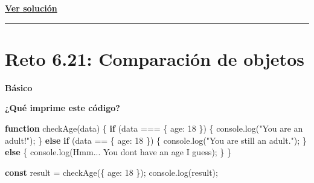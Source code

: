 \documentclass[
  letterpaper,
  DIV=11,
  numbers=noendperiod]{scrreprt}
\newenvironment{Shaded}{\begin{snugshade}}{\end{snugshade}}
\newcommand{\BuiltInTok}[1]{\textcolor[rgb]{0.00,0.23,0.31}{#1}}
\newcommand{\ControlFlowTok}[1]{\textcolor[rgb]{0.00,0.23,0.31}{\textbf{#1}}}
\newcommand{\DataTypeTok}[1]{\textcolor[rgb]{0.68,0.00,0.00}{#1}}
\newcommand{\DecValTok}[1]{\textcolor[rgb]{0.68,0.00,0.00}{#1}}
\newcommand{\FunctionTok}[1]{\textcolor[rgb]{0.28,0.35,0.67}{#1}}
\newcommand{\KeywordTok}[1]{\textcolor[rgb]{0.00,0.23,0.31}{\textbf{#1}}}
\newcommand{\NormalTok}[1]{\textcolor[rgb]{0.00,0.23,0.31}{#1}}
\newcommand{\OperatorTok}[1]{\textcolor[rgb]{0.37,0.37,0.37}{#1}}
\newcommand{\StringTok}[1]{\textcolor[rgb]{0.13,0.47,0.30}{#1}}
\newcommand{\VerbatimStringTok}[1]{\textcolor[rgb]{0.13,0.47,0.30}{#1}}
\begin{document}
\textbf{\hyperref[sec-sol-cap6-reto20]{Ver solución}}

\begin{center}\rule{0.5\linewidth}{0.5pt}\end{center}

\section{Reto 6.21: Comparación de objetos}\label{sec-cap6-reto21}

\begin{tcolorbox}[enhanced jigsaw, left=2mm, toprule=.15mm, leftrule=.75mm, breakable, colback=white, coltitle=black, bottomtitle=1mm, arc=.35mm, rightrule=.15mm, colframe=quarto-callout-caution-color-frame, opacitybacktitle=0.6, toptitle=1mm, opacityback=0, titlerule=0mm, title=\textcolor{quarto-callout-caution-color}{\faFire}\hspace{0.5em}{Dificultad}, bottomrule=.15mm, colbacktitle=quarto-callout-caution-color!10!white]

\textbf{Básico}

\end{tcolorbox}

\textbf{¿Qué imprime este código?}

\begin{Shaded}
\begin{Highlighting}[]
\KeywordTok{function} \FunctionTok{checkAge}\NormalTok{(data) \{}
  \ControlFlowTok{if}\NormalTok{ (data }\OperatorTok{===}\NormalTok{ \{ }\DataTypeTok{age}\OperatorTok{:} \DecValTok{18}\NormalTok{ \}) \{}
    \BuiltInTok{console}\OperatorTok{.}\FunctionTok{log}\NormalTok{(}\StringTok{"You are an adult!"}\NormalTok{)}\OperatorTok{;}
\NormalTok{  \} }\ControlFlowTok{else} \ControlFlowTok{if}\NormalTok{ (data }\OperatorTok{==}\NormalTok{ \{ }\DataTypeTok{age}\OperatorTok{:} \DecValTok{18}\NormalTok{ \}) \{}
    \BuiltInTok{console}\OperatorTok{.}\FunctionTok{log}\NormalTok{(}\StringTok{"You are still an adult."}\NormalTok{)}\OperatorTok{;}
\NormalTok{  \} }\ControlFlowTok{else}\NormalTok{ \{}
    \BuiltInTok{console}\OperatorTok{.}\FunctionTok{log}\NormalTok{(}\VerbatimStringTok{\textasciigrave{}Hmm... You don\textquotesingle{}t have an age I guess\textasciigrave{}}\NormalTok{)}\OperatorTok{;}
\NormalTok{  \}}
\NormalTok{\}}

\KeywordTok{const}\NormalTok{ result }\OperatorTok{=} \FunctionTok{checkAge}\NormalTok{(\{ }\DataTypeTok{age}\OperatorTok{:} \DecValTok{18}\NormalTok{ \})}\OperatorTok{;}
\BuiltInTok{console}\OperatorTok{.}\FunctionTok{log}\NormalTok{(result)}\OperatorTok{;}
\end{Highlighting}
\end{Shaded}
\end{document}
